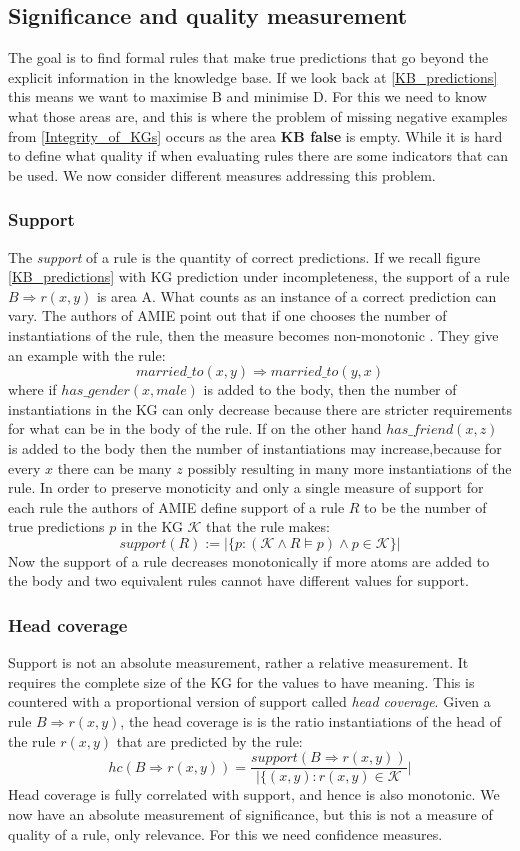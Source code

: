 \subsection{Significance and quality measurement}
\label{significance_and_quality}
The goal is to find formal rules that make true predictions that go beyond the explicit information in the knowledge base. If we look back at \cref{KB_predictions} this means we want to maximise B and minimise D. For this we need to know what those areas are, and this is where the problem of missing negative examples from \cref{Integrity_of_KGs} occurs as the area \textbf{KB false} is empty. While it is hard to define what quality if when evaluating rules there are some indicators that can be used. We now consider different measures addressing this problem.

\subsubsection{Support}
The \textit{support} of a rule is the quantity of correct predictions. If we recall figure \cref{KB_predictions} with KG prediction under incompleteness, the support of a rule $B \Rightarrow r(x,y)$ is area A. What counts as an instance of a correct prediction can vary. The authors of AMIE point out that if one chooses the number of instantiations of the rule, then the measure becomes non-monotonic \cite{amie3}. They give an example with the rule:
\[married\_to(x, y) \Rightarrow married\_to(y, x)\]
where if $has\_gender(x, male)$ is added to the body, then the number of instantiations in the KG can only decrease because there are stricter requirements for what can be in the body of the rule. If on the other hand $has\_friend(x, z)$ is added to the body then the number of instantiations may increase,because for every $x$ there can be many $z$ possibly resulting in many more instantiations of the rule. In order to preserve monoticity and only a single measure of support for each rule the authors of AMIE define support of a rule $R$ to be the number of true predictions $p$ in the KG $\mathcal{K}$ that the rule makes:
\[support(R) :=  | \{p : (\mathcal{K} \wedge R \models p)\wedge p \in \mathcal{K} \}|\]
Now the support of a rule decreases monotonically if more atoms are added to the body and two equivalent rules cannot have different values for support.

\subsubsection{Head coverage}
Support is not an absolute measurement, rather a relative measurement. It requires the complete size of the KG for the values to have meaning. This is countered with a proportional version of support called \emph{head coverage}. Given a rule $B \Rightarrow r(x,y)$, the head coverage is is the ratio instantiations of the head of the rule $r(x, y)$ that are predicted by the rule:
\[hc(B \Rightarrow r(x,y)) = \frac{support(B \Rightarrow r(x,y))}{|\{(x, y) : r(x, y) \in \mathcal{K}}|\]
Head coverage is fully correlated with support, and hence is also monotonic. We now have an absolute measurement of significance, but this is not a measure of quality of a rule, only relevance. For this we need confidence measures.


